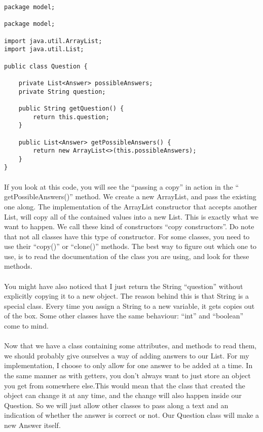 \documentclass[11pt,fleqn]{book} %
\begin{document}
\begin{lstlisting}
package model;

package model;

import java.util.ArrayList;
import java.util.List;

public class Question {
	
	private List<Answer> possibleAnswers;
	private String question;
	
	public String getQuestion() {
		return this.question;
	}
	
	public List<Answer> getPossibleAnswers() {
		return new ArrayList<>(this.possibleAnswers);
	}
}
\end{lstlisting}
\paragraph{} If you look at this code, you will see the ``passing a copy'' in action in the `` getPossibleAnswers()'' method. We create a new ArrayList, and pass the existing one along.
The implementation of the ArrayList constructor that accepts another List, will copy all of the contained values into a new List. This is exactly what we want to happen. We call these kind of constructors ``copy constructors''. Do note that not all classes have this type of constructor. For some classes, you need to use their ``copy()'' or ``clone()'' methods. The best way to figure out which one to use, is to read the documentation of the class you are using, and look for these methods.

\paragraph{}You might have also noticed that I just return the String ``question'' without explicitly copying it to a new object. The reason behind this is that String is a special class. Every time you assign a String to a new variable, it gets copies out of the box. Some other classes have the same behaviour: ``int'' and ``boolean'' come to mind. 

\paragraph{}Now that we have a class containing some attributes, and methods to read them, we should probably give ourselves a way of adding answers to our List.
For my implementation, I choose to only allow for one answer to be added at a time. In the same manner as with getters, you don't always want to just store an object you get from somewhere else.This would mean that the class that created the object can change it at any time, and the change will also happen inside our Question. So we will just allow other classes to pass along a text and an indication of whether the answer is correct or not. Our Question class will make a new Answer itself.
\end{document}
